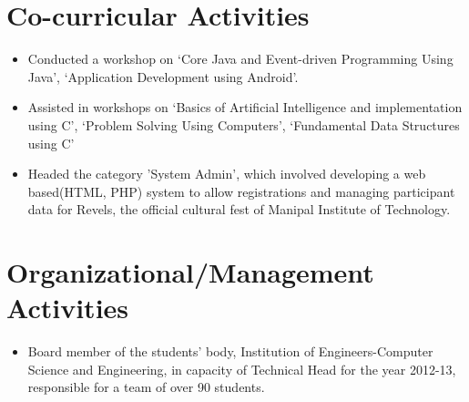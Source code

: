 \documentclass[11pt]{article}
\begin{document}
\section*{Co-curricular Activities}
\begin{itemize}
	\item[] Conducted a workshop on ‘Core Java and Event-driven Programming Using Java’, ‘Application Development using Android’.
	\item[] Assisted in workshops on ‘Basics of Artificial Intelligence and implementation using C’, ‘Problem Solving Using Computers’, ‘Fundamental Data Structures using C’
    \item[] Headed the category ’System Admin’, which involved developing a web based(HTML, PHP) system to allow registrations and managing participant data for Revels, the official cultural fest of Manipal Institute of Technology.
\end{itemize}

\section*{Organizational/Management Activities}
\begin{itemize}
	\item[] Board member of the students’ body, Institution of Engineers-Computer Science and Engineering, in capacity of Technical Head for the year 2012-13, responsible for a team of over 90 students.
\end{itemize}
\end{document}
